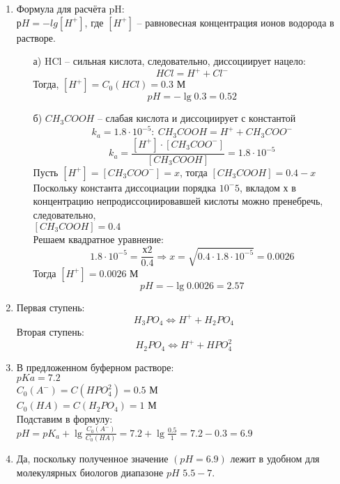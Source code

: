 \solutionSection

\begin{enumerate}
    \item 
    Формула для расчёта pH:\\
    $рH = -lg[H^+]$, где $[H^+]$ – равновесная концентрация ионов водорода в растворе.
    \begin{enumerate}
    \item[а)] HCl – сильная кислота, следовательно, диссоциирует нацело:
    $$HCl = H^+ + Cl^-$$
    Тогда, $[H^+] = C_0(HCl) = 0.3$ М\\
    $$pH = - \lg0.3 = 0.52$$
    \item[б)] $CH_3COOH$ – слабая кислота и диссоциирует с константой 
    $$k_a = 1.8\cdot 10^{-5}: \: CH_3COOH = H^+ + CH_3COO^-$$
    $$k_a = \frac{[H^+]\cdot[CH_3COO^-]}{[CH_3COOH]} = 1.8\cdot10^{-5}$$
    Пусть $[H^+] = [CH_3COO^-] = x$, тогда $[CH_3COOH] = 0.4 - x$\\
    Поскольку константа диссоциации порядка $10^-5$, вкладом х в концентрацию непродиссоциировавшей кислоты можно пренебречь, следовательно,\\$[CH_3COOH] = 0.4$\\
    Решаем квадратное уравнение:\\
    $$1.8\cdot10^{-5} = \frac{х2}{0.4} \Rightarrow x =\sqrt{0.4\cdot1.8\cdot10^{-5}} = 0.0026$$
    Тогда $[H^+] = 0.0026$ М\\
    $$pH = - \lg0.0026 = 2.57$$
    \end{enumerate}
    \item Первая ступень:\\
    $$H_3PO_4  \Leftrightarrow H^+ + H_2PO_4$$
    Вторая ступень:\\
    $$H_2PO_4  \Leftrightarrow H^+ + HPO_4^2$$
    \item В предложенном буферном растворе:\\
    $pKa = 7.2$\\
    $C_0(A^-) = C(HPO_4^2) = 0.5$ М\\
    $C_0(HA) = C(H_2PO_4) = 1$ М\\
    Подставим в формулу:\\
    $pH = pK_a + \lg\frac{C_0(A^-)}{C_0(HA)} = 7.2 + \lg\frac{0.5}{1} = 7.2 - 0.3 = 6.9$
    \item Да, поскольку полученное значение $(pH = 6.9)$ лежит в удобном для молекулярных биологов диапазоне $pH$ $5.5 - 7$. 
    \end{enumerate}